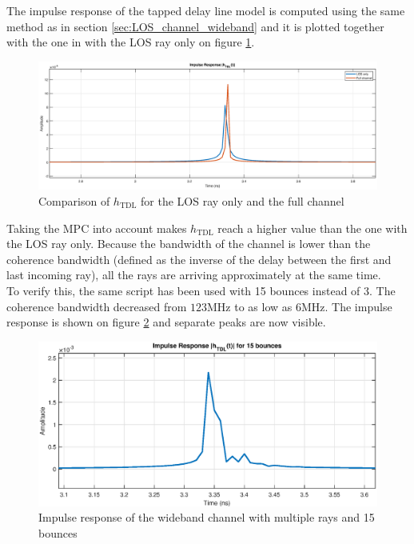 \documentclass[10pt,a4paper]{ULBreport}
\begin{document}
The impulse response of the tapped delay line model is computed using the same method as in section \ref{sec:LOS_channel_wideband} and it is plotted together with the one in with the LOS ray only on figure \ref{fig:impulse_response_TDL}. 

\begin{figure}[H]
    \centering
    \includegraphics[width=1\textwidth]{comparison_h_TDL.eps}
    \caption{Comparison of $h_{\text{TDL}}$ for the LOS ray only and the full channel}
    \label{fig:impulse_response_TDL}
\end{figure}

Taking the MPC into account makes $h_{\text{TDL}}$ reach a higher value than the one with the LOS ray only. Because the bandwidth of the channel is lower than the coherence bandwidth (defined as the inverse of the delay between the first and last incoming ray), all the rays are arriving approximately at the same time. \\
To verify this, the same script has been used with 15 bounces instead of 3. The coherence bandwidth decreased from $123$MHz to as low as $6$MHz. The impulse response is shown on figure \ref{fig:impulse_response_TDL_15_bounces} and separate peaks are now visible.

\begin{figure}[H]
    \centering
    \includegraphics[width=1\textwidth]{5_3_15_bounces.eps}
    \caption{Impulse response of the wideband channel with multiple rays and 15 bounces}
    \label{fig:impulse_response_TDL_15_bounces}
\end{figure}
\end{document}
